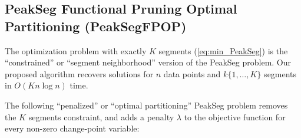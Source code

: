 \documentclass{article}
\begin{document}

\subsection{PeakSeg Functional Pruning Optimal Partitioning (PeakSegFPOP)}

The optimization problem with exactly $K$ segments
(\ref{eq:min_PeakSeg}) is the ``constrained'' or ``segment
neighborhood'' version of the PeakSeg problem. Our proposed algorithm
recovers solutions for $n$ data points and $k\{1,\dots,K\}$ segments
in $O(K n \log n)$ time. 

The following ``penalized'' or ``optimal
partitioning'' PeakSeg problem removes the $K$ segments constraint,
and adds a penalty $\lambda$ to the objective function for every
non-zero change-point variable:
\end{document}

